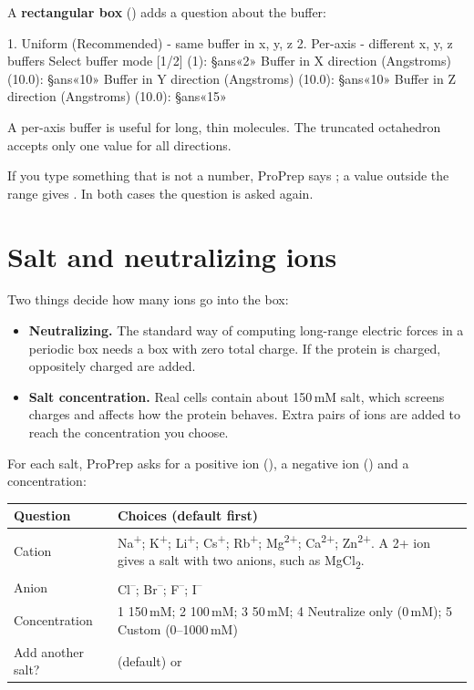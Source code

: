 A \textbf{rectangular box} () adds a question about the buffer:

\begin{screen}
  1. Uniform (Recommended) - same buffer in x, y, z
  2. Per-axis - different x, y, z buffers
Select buffer mode [1/2] (1): §ans«2»
Buffer in X direction (Angstroms) (10.0): §ans«10»
Buffer in Y direction (Angstroms) (10.0): §ans«10»
Buffer in Z direction (Angstroms) (10.0): §ans«15»
\end{screen}

A per-axis buffer is useful for long, thin molecules. The truncated
octahedron accepts only one value for all directions.

If you type something that is not a number, ProPrep says ; a value outside the range gives . In both cases the question is asked again.

\section{Salt and neutralizing ions}\label{sec:topology-salt}

Two things decide how many ions go into the box:

\begin{itemize}
  \item \textbf{Neutralizing.} The standard way of computing long-range
        electric forces in a periodic box needs a box with zero total charge.
        If the protein is charged, oppositely charged  are
        added.
  \item \textbf{Salt concentration.} Real cells contain about 150\,mM salt,
        which screens charges and affects how the protein behaves. Extra pairs
        of ions are added to reach the concentration you choose.
\end{itemize}

For each salt, ProPrep asks for a positive ion (), a negative
ion () and a concentration:

\begin{tabularx}{\linewidth}{@{}lL@{}}
\toprule
\textbf{Question} & \textbf{Choices (default first)} \\
\midrule
Cation & Na\textsuperscript{+}; K\textsuperscript{+}; Li\textsuperscript{+};
  Cs\textsuperscript{+}; Rb\textsuperscript{+}; Mg\textsuperscript{2+};
  Ca\textsuperscript{2+}; Zn\textsuperscript{2+}. A 2+ ion gives a salt with
  two anions, such as MgCl\textsubscript{2}. \\
Anion & Cl\textsuperscript{--}; Br\textsuperscript{--}; F\textsuperscript{--};
  I\textsuperscript{--} \\
Concentration & 1 150\,mM; 2 100\,mM; 3 50\,mM; 4 Neutralize only (0\,mM);
  5 Custom (0--1000\,mM) \\
Add another salt? &  (default) or  \\
\bottomrule
\end{tabularx}

